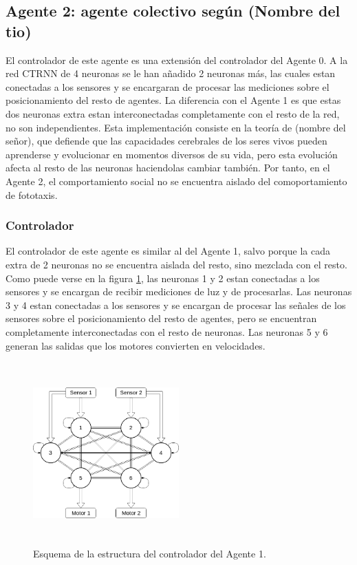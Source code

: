 \subsection{Agente 2: agente colectivo según (Nombre del tio)}
El controlador de este agente es una extensión del controlador del Agente 0. A la red CTRNN de 4 neuronas se le han añadido 2 neuronas más, las cuales estan conectadas a los sensores y se encargaran de procesar las mediciones sobre el posicionamiento
del resto de agentes. La diferencia con el Agente 1 es que estas dos neuronas extra estan interconectadas completamente con el resto de la red, no son independientes. Esta implementación consiste en la teoría de (nombre del señor), que defiende que
las capacidades cerebrales de los seres vivos pueden aprenderse y evolucionar en momentos diversos de su vida, pero esta evolución afecta al resto de las neuronas haciendolas cambiar también. Por tanto, en el Agente 2, el comportamiento social no se
encuentra aislado del comoportamiento de fototaxis.

\subsubsection{Controlador}
El controlador de este agente es similar al del Agente 1, salvo porque la cada extra de 2 neuronas no se encuentra aislada del resto, sino mezclada con el resto. Como puede verse en la figura \ref{fig:a2Controller}, las neuronas 1 y 2 estan conectadas
a los sensores y se encargan de recibir mediciones de luz y de procesarlas. Las neuronas 3 y 4 estan conectadas a los sensores y se encargan de procesar las señales de los sensores sobre el posicionamiento del resto de agentes, pero se encuentran completamente
interconectadas con el resto de neuronas. Las neuronas 5 y 6 generan las salidas que los motores convierten en velocidades.

\begin{figure}[H]
	\centering
	\includegraphics[width=0.5\textwidth,height=7cm]{Imagenes/Agent2Controller}
	\caption{Esquema de la estructura del controlador del Agente 1.}
	\label{fig:a2Controller}
\end{figure}

